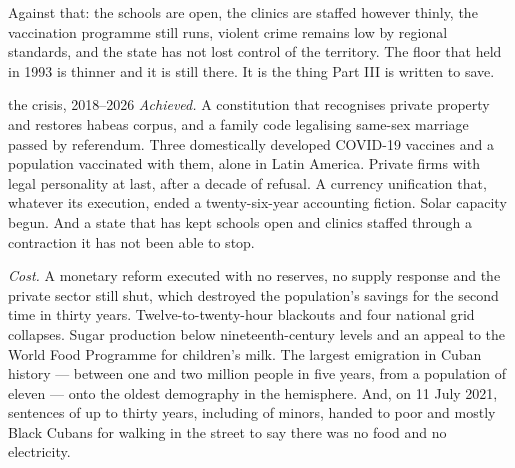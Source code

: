 Against that: the schools are open, the clinics are staffed however thinly, the
vaccination programme still runs, violent crime remains low by regional
standards, and the state has not lost control of the territory. The floor that
held in 1993 is thinner and it is still there. It is the thing Part III is
written to save.

\begin{ledger}{the crisis, 2018--2026}
\emph{Achieved.} A constitution that recognises private property and restores
habeas corpus, and a family code legalising same-sex marriage passed by
referendum. Three domestically developed COVID-19 vaccines and a population
vaccinated with them, alone in Latin America. Private firms with legal
personality at last, after a decade of refusal. A currency unification that,
whatever its execution, ended a twenty-six-year accounting fiction. Solar
capacity begun. And a state that has kept schools open and clinics staffed
through a contraction it has not been able to stop.

\emph{Cost.} A monetary reform executed with no reserves, no supply response and
the private sector still shut, which destroyed the population's savings for the
second time in thirty years. Twelve-to-twenty-hour blackouts and four national
grid collapses. Sugar production below nineteenth-century levels and an appeal
to the World Food Programme for children's milk. The largest emigration in
Cuban history --- between one and two million people in five years, from a
population of eleven --- onto the oldest demography in the hemisphere. And, on
11 July 2021, sentences of up to thirty years, including of minors,
handed to poor and mostly Black Cubans for walking in the street to say there
was no food and no electricity.
\end{ledger}
